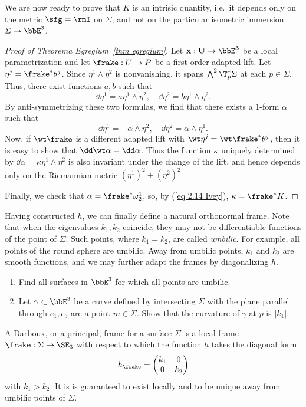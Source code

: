 We are now ready to prove that $K$ is an intrisic quantity, i.e.\ it depends only on the metric $\sfg=\rmI$ on $\Sigma$, and not on the particular isometric immersion $\Sigma\to \bbE^3$.

\begin{proof}[Proof of Theorema Egregium~\ref{thm egregium}]
    Let $\bf{x}:U\to \bbE^3$ be a local parametrization and let $\frake:U\to P$ be a first-order adapted lift. Let $\eta^j=\frake^\ast\theta^j$. Since $\eta^1\wedge\eta^2$ is nonvanishing, it spans $\bigwedge^2 \T_p^\ast\Sigma$ at each $p\in\Sigma$. Thus, there exist functions $a,b$ such that 
    \[\dd\eta^1=a\eta^1\wedge\eta^2,\quad \dd\eta^2=b\eta^1\wedge \eta^2.\]
    By anti-symmetrizing these two formulas, we find that there exists a $1$-form $\alpha$ such that 
    \[\dd\eta^1=-\alpha\wedge\eta^2,\quad \dd\eta^2=\alpha\wedge\eta^1.\]
    Now, if $\wt\frake$ is a different adapted lift with $\wt\eta^j=\wt\frake^\ast\theta^j$, then it is easy to show that $\dd\wt\alpha=\dd\alpha$. Thus the function $\kappa$ uniquely determined by $\dd\alpha=\kappa\eta^1\wedge\eta^2$ is also invariant under the change of the lift, and hence depends only on the Riemannian metric $(\eta^1)^2+(\eta^2)^2$.

    Finally, we check that $\alpha=\frake^\ast\omega_2^1$, so, by (\ref{eq 2.14 Ivey}), $\kappa=\frake^\ast K$.
\end{proof}

Having constructed $h$, we can finally define a natural orthonormal frame. Note that when the eigenvalues $k_1,k_2$ coincide, they may not be differentiable functions of the point of $\Sigma$. Such points, where $k_1=k_2$, are called \emph{umbilic}. For example, all points of the round sphere are umbilic. Away from umbilic points, $k_1$ and $k_2$ are smooth functions, and we may further adapt the frames by diagonalizing $h$. 

\begin{xca}
    \begin{enumerate}
        \item Find all surfaces in $\bbE^3$ for which all points are umbilic.
        \item Let $\gamma\subset\bbE^3$ be a curve defined by intersecting $\Sigma$ with the plane parallel through $e_1,e_3$ are a point $m\in\Sigma$. Show that the curvature of $\gamma$ at $p$ is $|k_1|$.
    \end{enumerate}
\end{xca}


\begin{defn}
    A Darboux, or a principal, frame for a surface $\Sigma$ is a local frame $\frake:\Sigma\to \SE_3$ with respect to which the function $h$ takes the diagonal form 
    \[h_\frake=\begin{pmatrix}
        k_1&0\\
        0& k_2
    \end{pmatrix}\]
    with $k_1>k_2$. It is is guaranteed to exist locally and to be unique away from umbilic points of $\Sigma$.
\end{defn}

